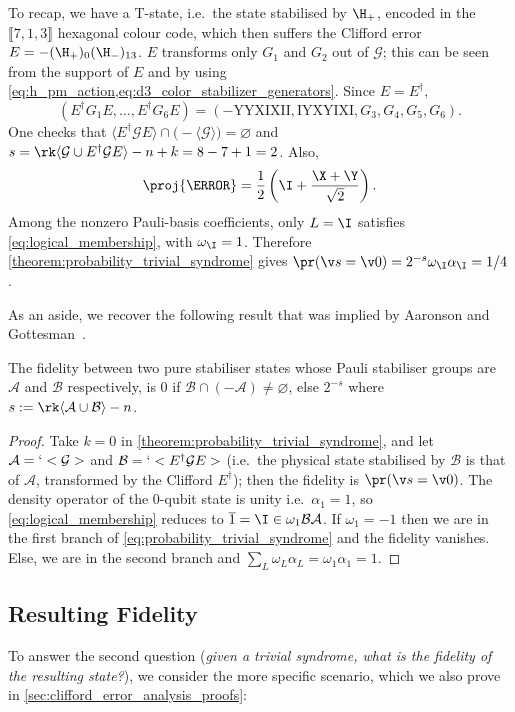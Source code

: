 \begin{eg*}
To recap,
we have a T-state,
i.e.\ the state stabilised by $\H_+$,
encoded in the $\llbracket 7, 1, 3 \rrbracket$ hexagonal colour code,
which then suffers the Clifford error
$E =-(\H_+)_0 (\H_-)_{1 3}$.
$E$ transforms only $G_1$ and $G_2$ out of $\mathcal G$;
this can be seen from the support of $E$
and by using \cref{eq:h_pm_action,eq:d3_color_stabilizer_generators}.
Since $E=E^\dagger$,
\begin{equation}
(E^\dagger G_1E,\ldots,E^\dagger G_6E)=(
-\mathrm{YYXIXII},
\mathrm{IYXYIXI},
G_3,G_4,G_5,G_6).
\end{equation}
One checks that
$\langle E^\dagger \mathcal G E\rangle
\cap
\bigl(-\langle\mathcal G\rangle\bigr)=\varnothing$
and
$s=\rk\langle\mathcal G\cup E^\dagger\mathcal G E\rangle-n +k
=8-7+1=2$.
Also,
\begin{equation}
\proj{\T}
=\frac12\left(\I+\frac{\X+\Y}{\sqrt2}\right).
\end{equation}
Among the nonzero Pauli-basis coefficients,
only $L=\I$ satisfies \cref{eq:logical_membership},
with $\omega_\I=1$.
Therefore \cref{theorem:probability_trivial_syndrome}
gives $\pr(\v s=\v0) =2^{-s} \omega_\I \alpha_\I =1/4$.
\end{eg*}
\noindent
As an aside,
we recover the following result
that was implied by Aaronson and Gottesman~\cite[p~5]{Aaronson2004}.
\begin{cor}
The fidelity between two pure stabiliser states
whose Pauli stabiliser groups are
$\mathcal A$ and $\mathcal B$ respectively,
is $0$ if $\mathcal B \cap
(-\mathcal A)
\neq \varnothing$,
else $2^{-s}$
where $s := \rk\langle \mathcal A\cup \mathcal B \rangle -n$.
\end{cor}
\begin{proof}
Take $k =0$
in \cref{theorem:probability_trivial_syndrome},
and let $\mathcal A =`<\mathcal G>$
and $\mathcal B =`<E^\dag \mathcal G E>$
(i.e.\ the physical state stabilised by $\mathcal B$
is that of $\mathcal A$,
transformed by the Clifford $E^\dag$);
then the fidelity is $\pr(\v s =\v 0)$.
The density operator of the 0-qubit state is unity
i.e.\ $\alpha_1 =1$,
so \cref{eq:logical_membership}
reduces to $\overline{1} =\I \in \omega_1 \mathcal B \mathcal A$.
If $\omega_1 =-1$ then we are in the first branch of
\cref{eq:probability_trivial_syndrome} and the fidelity vanishes.
Else,
we are in the second branch and
$\sum_L \omega_L \alpha_L =\omega_1 \alpha_1 =1$.
\end{proof}

\subsection{Resulting Fidelity}
\label{sec:resulting_fidelity}
To answer the second question
(\textit{given a trivial syndrome,
what is the fidelity of the resulting state?}),
we consider the more specific scenario,
which we also prove in \cref{sec:clifford_error_analysis_proofs}:

